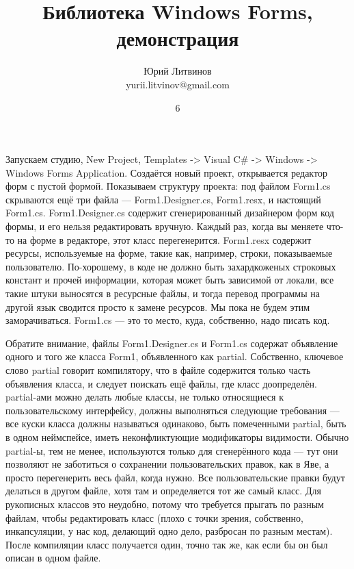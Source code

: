 \documentclass[a5paper]{article}
\title{Библиотека Windows Forms, демонстрация}
\author{Юрий Литвинов\\\small{yurii.litvinov@gmail.com}}
\date{6}
\begin{document}
\maketitle
\thispagestyle{empty}

Запускаем студию, New Project, Templates -> Visual C\# -> Windows -> Windows Forms Application. Создаётся новый проект, открывается редактор форм с пустой формой. Показываем структуру проекта: под файлом Form1.cs скрываются ещё три файла --- Form1.Designer.cs, Form1.resx, и настоящий Form1.cs. Form1.Designer.cs содержит сгенерированный дизайнером форм код формы, и его нельзя редактировать вручную. Каждый раз, когда вы меняете что-то на форме в редакторе, этот класс перегенерится. Form1.resx содержит ресурсы, используемые на форме, такие как, например, строки, показываемые пользователю. По-хорошему, в коде не должно быть захардкоженых строковых констант и прочей информации, которая может быть зависимой от локали, все такие штуки выносятся в ресурсные файлы, и тогда перевод программы на другой язык сводится просто к замене ресурсов. Мы пока не будем этим заморачиваться. Form1.cs --- это то место, куда, собственно, надо писать код.

Обратите внимание, файлы Form1.Designer.cs и Form1.cs содержат объявление одного и того же класса Form1, объявленного как partial. Собственно, ключевое слово partial говорит компилятору, что в файле содержится только часть объявления класса, и следует поискать ещё файлы, где класс доопределён. partial-ами можно делать любые классы, не только относящиеся к пользовательскому интерфейсу, должны выполняться следующие требования --- все куски класса должны называться одинаково, быть помеченными partial, быть в одном неймспейсе, иметь неконфликтующие модификаторы видимости. Обычно partial-ы, тем не менее, используются только для сгенерённого кода --- тут они позволяют не заботиться о сохранении пользовательских правок, как в Яве, а просто перегенерить весь файл, когда нужно. Все пользовательские правки будут делаться в другом файле, хотя там и определяется тот же самый класс. Для рукописных классов это неудобно, потому что требуется прыгать по разным файлам, чтобы редактировать класс (плохо с точки зрения, собственно, инкапсуляции, у нас код, делающий одно дело, разбросан по разным местам). После компиляции класс получается один, точно так же, как если бы он был описан в одном файле.
\end{document}
